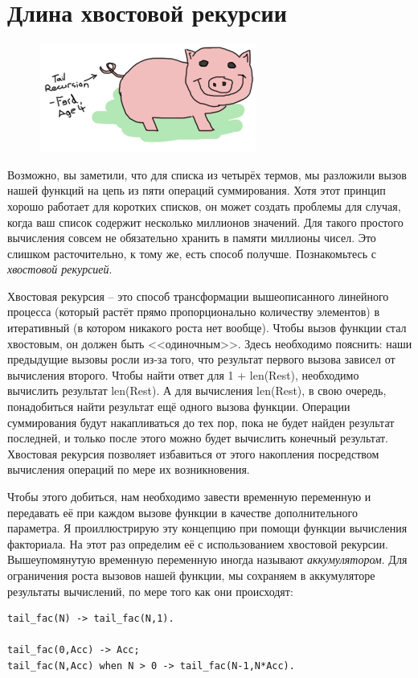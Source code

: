 \documentclass[a4paper,12pt]{report}
\newcommand{\ops}{\colorbox{lgreen}}
\begin{document}
\section{Длина хвостовой рекурсии}
\label{length_of_a_tail_recursion}

\begin{figure}
    \includegraphics[width=1\linewidth]{tail-recursion.png}
\end{figure}
Возможно, вы заметили, что для списка из четырёх термов, мы разложили вызов нашей функций на цепь из пяти операций суммирования. Хотя этот принцип хорошо работает для коротких списков, он может создать проблемы для случая, когда ваш список содержит несколько миллионов значений. Для такого простого вычисления совсем не обязательно хранить в памяти миллионы чисел. Это слишком расточительно, к тому же, есть способ получше. Познакомьтесь с \emph{хвостовой рекурсией}.

Хвостовая рекурсия \--- это способ трансформации вышеописанного линейного процесса (который растёт прямо пропорционально количеству элементов) в итеративный (в котором никакого роста нет вообще). Чтобы вызов функции стал хвостовым, он должен быть <<одиночным>>. Здесь необходимо пояснить: наши предыдущие вызовы росли из\--за того, что результат первого вызова зависел от вычисления второго. Чтобы найти ответ для \ops{1 + len(Rest)}, необходимо вычислить результат \ops{len(Rest)}. А для вычисления \ops{len(Rest)}, в свою очередь, понадобиться найти результат ещё одного вызова функции. Операции суммирования будут накапливаться до тех пор, пока не будет найден результат последней, и только после этого можно будет вычислить конечный результат. Хвостовая рекурсия позволяет избавиться от этого накопления посредством вычисления операций по мере их возникновения.

Чтобы этого добиться, нам необходимо завести временную переменную и передавать её при каждом вызове функции в качестве дополнительного параметра. Я проиллюстрирую эту концепцию при помощи функции вычисления факториала. На этот раз определим её с использованием хвостовой рекурсии. Вышеупомянутую временную переменную иногда называют \emph{аккумулятором}. Для ограничения роста вызовов нашей функции, мы сохраняем в аккумуляторе результаты вычислений, по мере того как они происходят:
\begin{lstlisting}[style=erlang]
tail_fac(N) -> tail_fac(N,1).
 
tail_fac(0,Acc) -> Acc;
tail_fac(N,Acc) when N > 0 -> tail_fac(N-1,N*Acc).
\end{lstlisting}
\end{document}
